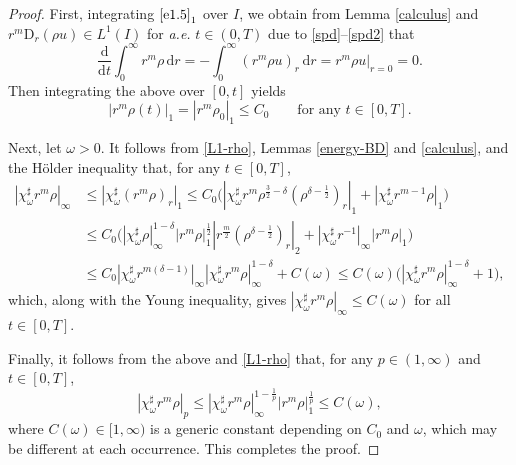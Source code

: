 \documentclass[11pt,reqno]{amsart}
\numberwithin{rk}{section}
\numberwithin{prop}{section}
\numberwithin{mydef}{section}
\numberwithin{lem}{section}
\numberwithin{equation}{section}
\numberwithin{thm}{section}
\begin{document}
\begin{proof}
First, integrating $\eqref{e1.5}_1$ over $I$, we obtain 
from  Lemma \ref{calculus} and $r^m \mathrm{D}_r(\rho u) \in L^1(I)$ for \textit{a.e.} $t\in (0,T)$ due to \eqref{spd}--\eqref{spd2} that 
\begin{equation*} 
\frac{\mathrm{d}}{\mathrm{d}t}\int_0^\infty r^m\rho \,\mathrm{d}r=-\int_0^\infty (r^m \rho u)_r \,\mathrm{d}r=r^m \rho u|_{r=0}=0.
\end{equation*}
Then integrating the above over $[0,t]$ yields 
\begin{equation}\label{L1-rho}
|r^m\rho(t)|_1=|r^m\rho_0|_1\leq C_0 \qquad \text{for any $t\in [0,T]$}.
\end{equation}

Next, let $\omega>0$. It follows from \eqref{L1-rho}, Lemmas \ref{energy-BD} and \ref{calculus}, and the H\"older inequality that, for any $t\in [0,T]$,
\begin{equation*}
\begin{aligned}
|\chi^\sharp_\omega r^m\rho|_\infty&\leq |\chi^\sharp_\omega (r^m\rho)_r|_1\leq C_0\big(|\chi_\omega^\sharp r^m\rho^{\frac{3}{2}-\delta} (\rho^{\delta-\frac{1}{2}})_r|_1 + |\chi_\omega^\sharp r^{m-1}\rho|_1\big)\\
& \leq C_0\big(|\chi^\sharp_\omega\rho|_\infty^{1-\delta}|r^{m}\rho|_{1}^{\frac{1}{2}}|r^\frac{m}{2}(\rho^{\delta-\frac{1}{2}})_r|_2 +  |\chi_\omega^\sharp r^{-1}|_\infty |r^{m}\rho|_1\big)\\
&\leq C_0 |\chi^\sharp_\omega r^{m(\delta-1)}|_\infty |\chi^\sharp_\omega r^m\rho|_\infty^{1-\delta}+C(\omega)
\leq C(\omega)\big(|\chi^\sharp_\omega r^m\rho|_\infty^{1-\delta}+1\big),
\end{aligned}
\end{equation*}
which, along with the Young inequality, gives $|\chi^\sharp_\omega r^m\rho|_\infty \leq C(\omega)$ for all $t\in [0,T]$. 

Finally, it follows from the above and \eqref{L1-rho} that, 
for any $p\in(1,\infty)$ and $t\in [0,T]$,
\begin{equation*}
|\chi^\sharp_\omega r^m\rho|_p\leq |\chi^\sharp_\omega r^m\rho|_\infty^{1-\frac{1}{p}}|r^m\rho|_1^\frac{1}{p} \leq C(\omega),
\end{equation*}
where $C(\omega)\in [1,\infty)$ is a generic  constant depending on $C_0$ and $\omega$, which may be different at each occurrence. This completes the proof.
\end{proof}
\end{document}
